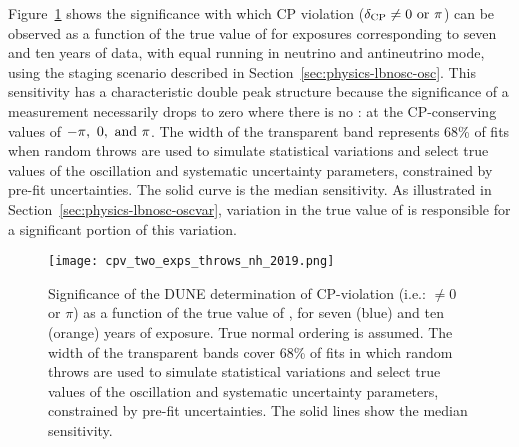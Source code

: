 Figure~\ref{fig:cpv_nominal} shows the significance with which CP
violation ($\mdeltacp \neq 0 \ {\rm or} \ \pi$) can be observed as a
function of the true value of \deltacp for exposures corresponding to seven and ten years of data, with equal running in neutrino and antineutrino mode, using the staging scenario described in Section~\ref{sec:physics-lbnosc-osc}.
This sensitivity has a characteristic double peak
structure because the significance of a  measurement
necessarily drops to zero where there is no : at the
CP-conserving values of $-\pi,~0,~{\rm and}~\pi$. The width of the transparent band represents 68\% of fits when random throws are used to simulate statistical variations and select true values of the oscillation and systematic uncertainty parameters, constrained by pre-fit uncertainties. The solid curve is the median sensitivity. As illustrated in Section~\ref{sec:physics-lbnosc-oscvar}, variation in the true value of  is responsible for a significant portion of this variation.

\begin{figure}[h!]
    \centering
		\texttt{[image: cpv\_two\_exps\_throws\_nh\_2019.png]}
	\caption[Significance of the DUNE determination of CP-violation as a function of \deltacp]{Significance of the DUNE determination of CP-violation (i.e.: \deltacp $\neq 0$ or $\pi$) as a function of the true value of \deltacp, for seven (blue) and ten (orange) years of exposure. True normal ordering is assumed. The width of the transparent bands cover 68\% of fits in which random throws are used to simulate statistical variations and select true values of the oscillation and systematic uncertainty parameters, constrained by pre-fit uncertainties. The solid lines show the median sensitivity.}
    \label{fig:cpv_nominal}
\end{figure}

